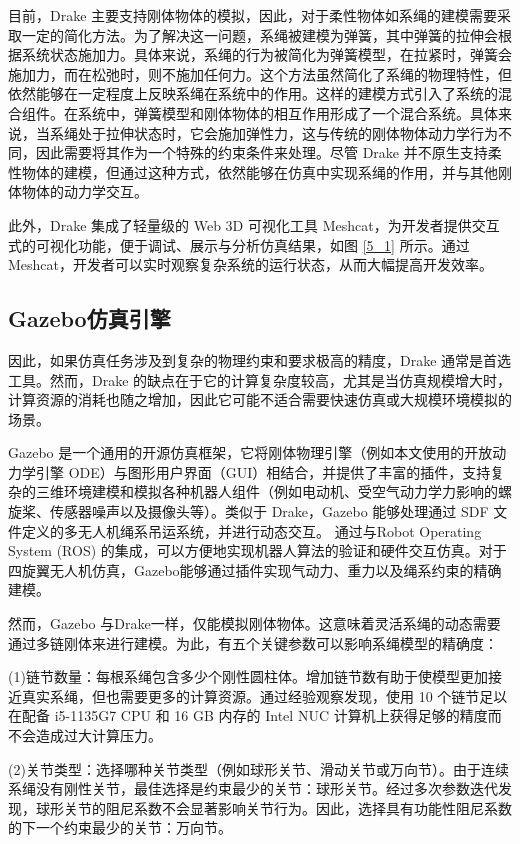 \documentclass[lang=chs, degree=master, blindreview=true, winfonts=true]{yanputhesis}
\begin{document}
目前，Drake 主要支持刚体物体的模拟，因此，对于柔性物体如系绳的建模需要采取一定的简化方法。为了解决这一问题，系绳被建模为弹簧，其中弹簧的拉伸会根据系统状态施加力。具体来说，系绳的行为被简化为弹簧模型，在拉紧时，弹簧会施加力，而在松弛时，则不施加任何力。这个方法虽然简化了系绳的物理特性，但依然能够在一定程度上反映系绳在系统中的作用。这样的建模方式引入了系统的混合组件。在系统中，弹簧模型和刚体物体的相互作用形成了一个混合系统。具体来说，当系绳处于拉伸状态时，它会施加弹性力，这与传统的刚体物体动力学行为不同，因此需要将其作为一个特殊的约束条件来处理。尽管 Drake 并不原生支持柔性物体的建模，但通过这种方式，依然能够在仿真中实现系绳的作用，并与其他刚体物体的动力学交互。

此外，Drake 集成了轻量级的 Web 3D 可视化工具 Meshcat，为开发者提供交互式的可视化功能，便于调试、展示与分析仿真结果，如图 \ref{5_1} 所示。通过 Meshcat，开发者可以实时观察复杂系统的运行状态，从而大幅提高开发效率。

\subsection{Gazebo仿真引擎}

因此，如果仿真任务涉及到复杂的物理约束和要求极高的精度，Drake 通常是首选工具。然而，Drake 的缺点在于它的计算复杂度较高，尤其是当仿真规模增大时，计算资源的消耗也随之增加，因此它可能不适合需要快速仿真或大规模环境模拟的场景。

Gazebo 是一个通用的开源仿真框架，它将刚体物理引擎（例如本文使用的开放动力学引擎 ODE）与图形用户界面（GUI）相结合，并提供了丰富的插件，支持复杂的三维环境建模和模拟各种机器人组件（例如电动机、受空气动力学力影响的螺旋桨、传感器噪声以及摄像头等）。类似于 Drake，Gazebo 能够处理通过 SDF 文件定义的多无人机绳系吊运系统，并进行动态交互。
通过与Robot Operating System (ROS) 的集成，可以方便地实现机器人算法的验证和硬件交互仿真。对于四旋翼无人机仿真，Gazebo能够通过插件实现气动力、重力以及绳系约束的精确建模。

然而，Gazebo 与Drake一样，仅能模拟刚体物体。这意味着灵活系绳的动态需要通过多链刚体来进行建模。为此，有五个关键参数可以影响系绳模型的精确度：

(1){链节数量}：每根系绳包含多少个刚性圆柱体。增加链节数有助于使模型更加接近真实系绳，但也需要更多的计算资源。通过经验观察发现，使用 10 个链节足以在配备 i5-1135G7 CPU 和 16 GB 内存的 Intel NUC 计算机上获得足够的精度而不会造成过大计算压力。
    
(2){关节类型}：选择哪种关节类型（例如球形关节、滑动关节或万向节）。由于连续系绳没有刚性关节，最佳选择是约束最少的关节：球形关节。经过多次参数迭代发现，球形关节的阻尼系数不会显著影响关节行为。因此，选择具有功能性阻尼系数的下一个约束最少的关节：万向节。
    
\end{document}
